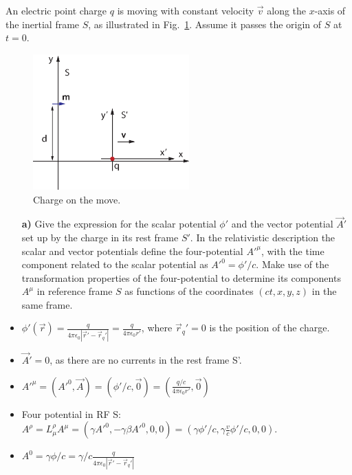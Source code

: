 \documentclass[11pt,a4paper]{report}
\newcounter{excount}[chapter]
\newenvironment{exercise}[1][]{\addtocounter{excount}{1} \noindent {\bf Problem
    \arabic{excount} \ \ #1}\hspace{2mm}}{\vspace{4mm}}
\begin{document}
\begin{exercise}
An electric point charge $q$ is moving with constant velocity $\vec v$ along the $x$-axis of the inertial frame $S$, as illustrated in Fig.~\ref{fig:dipole}. Assume it passes the origin of $S$ at $t=0$.

\begin{figure}[h]
\begin{center}
\includegraphics[width=6cm]{dipole.eps}
\end{center}
\caption{Charge on the move. \label{fig:dipole}}
\end{figure}

\begin{itemize}
\item[{\bf a)}] Give the expression for the scalar potential $\phi'$ and the vector potential $\vec A'$ set up by the charge in its rest frame $S'$. In the relativistic description the scalar and vector potentials define the four-potential $A'^\mu$, with the time component related to the scalar potential as $A'^0=\phi'/c$.  Make use of the transformation properties of the four-potential to determine its components $A^\mu$ in reference frame $S$ as functions of the coordinates $(ct, x, y, z)$ in the same frame.

\item $\phi' (\vec r)=\frac{q}{4\pi \epsilon_0 |\vec r'-\vec r_q'|} =\frac{q}{4\pi \epsilon_0 r'} $, where $\vec r_q'=0$ is the position of the charge.
\item $\vec A' =0$, as there are no currents in the rest frame S'.
\item $A'^{\mu}=(A'^0,\vec A)=(\phi' / c, \vec 0)=(\frac{q/c}{4\pi \epsilon_0 r' },\vec 0)$
\item Four potential in RF S: $A^{\rho}=L^{\rho}_{\mu}A^{\mu}=(\gamma A'^0 , -\gamma \beta A'^0,0,0)=  (\gamma \phi' / c, \gamma \frac{v}{c} \phi'/c,0,0)$. 
\item $A^0=\gamma \phi/c=\gamma/c \frac{q}{4\pi \epsilon_0 |\vec r'-\vec r_q'|} $


\end{itemize}
\end{exercise}
\end{document}
